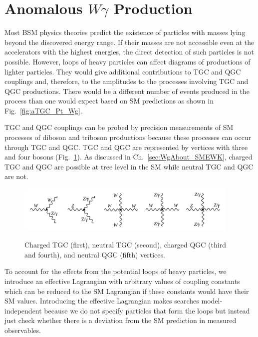 \section{Anomalous $W\gamma$ Production}
\label{sec:WgAbout_ATGC}

Most BSM physics theories predict the existence of particles with masses lying beyond the discovered energy range. If their masses are not accessible even at the accelerators with the highest energies, the direct detection of such particles is not possible. However, loops of heavy particles can affect diagrams of productions of lighter particles. They would give additional contributions to TGC and QGC couplings and, therefore, to the amplitudes to the processes involving TGC and QGC productions. There would be a different number of events produced in the process than one would expect based on SM predictions as shown in Fig.~\ref{fig:aTGC_Pt_Wg}.

TGC and QGC couplings can be probed by precision measurements of SM processes of diboson and triboson productions because these processes can occur through TGC and QGC. TGC and QGC are represented by vertices with three and four bosons (Fig.~\ref{fig:TGC_and_QGC_vertices}). As discussed in Ch.~\ref{sec:WgAbout_SMEWK}, charged TGC and QGC are possible at tree level in the SM while neutral TGC and QGC are not.
 
\begin{figure}[htb]
  \begin{center}
    {\includegraphics[width=0.95\textwidth]{../figs/WgAbout/TGC_and_QGC_vertices.png}}
    \caption{Charged TGC (first), neutral TGC (second), charged QGC (third and fourth), and neutral QGC (fifth) vertices.}
    \label{fig:TGC_and_QGC_vertices}
  \end{center}
\end{figure}

To account for the effects from the potential loops of heavy particles, we introduce an effective Lagrangian with arbitrary values of coupling constants which can be reduced to the SM Lagrangian if these constants would have their SM values. Introducing the effective Lagrangian makes searches model-independent because we do not specify particles that form the loops but instead just check whether there is a deviation from the SM prediction in measured observables. 

